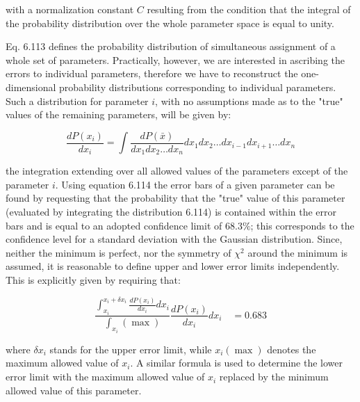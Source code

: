 \documentclass[10pt]{article}
\begin{document}
with a normalization constant $C$ resulting from the condition that the integral of the probability distribution over the whole parameter space is equal to unity.

Eq. 6.113 defines the probability distribution of simultaneous assignment of a whole set of parameters. Practically, however, we are interested in ascribing the errors to individual parameters, therefore we have to reconstruct the one-dimensional probability distributions corresponding to individual parameters. Such a distribution for parameter $i$, with no assumptions made as to the "true" values of the remaining parameters, will be given by:


\begin{equation*}
\frac{d P\left(x_{i}\right)}{d x_{i}}=\int \frac{d P(\bar{x})}{d x_{1} d x_{2} \ldots d x_{n}} d x_{1} d x_{2} \ldots d x_{i-1} d x_{i+1} \ldots d x_{n} \tag{6.118}
\end{equation*}


the integration extending over all allowed values of the parameters except of the parameter $i$. Using equation 6.114 the error bars of a given parameter can be found by requesting that the probability that the "true" value of this parameter (evaluated by integrating the distribution 6.114) is contained within the error bars and is equal to an adopted confidence limit of $68.3 \%$; this corresponds to the confidence level for a standard deviation with the Gaussian distribution. Since, neither the minimum is perfect, nor the symmetry of $\chi^{2}$ around the minimum is assumed, it is reasonable to define upper and lower error limits independently. This is explicitly given by requiring that:


\begin{equation*}
\frac{\int_{x_{i}}^{x_{i}+\delta x_{i}} \frac{d P\left(x_{i}\right)}{d x_{i}} d x_{i}}{\int_{x_{i}}(\max )} \frac{d P\left(x_{i}\right)}{d x_{i}} d x_{i} \quad=0.683 \tag{6.119}
\end{equation*}


where $\delta x_{i}$ stands for the upper error limit, while $x_{i}(\max )$ denotes the maximum allowed value of $x_{i}$. A similar formula is used to determine the lower error limit with the maximum allowed value of $x_{i}$ replaced by the minimum allowed value of this parameter.
\end{document}
